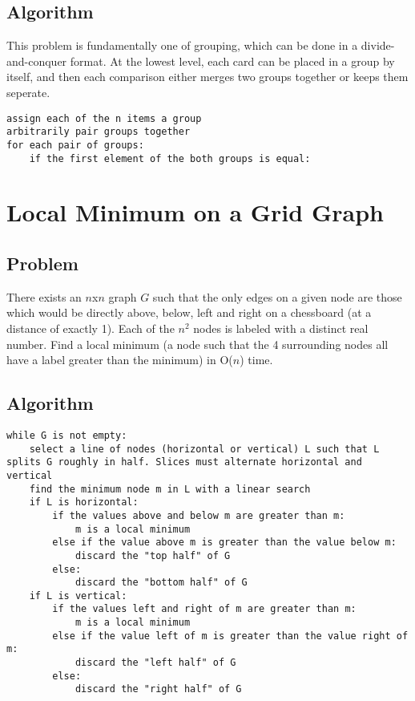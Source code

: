 \documentclass[titlepage]{article}
\numberwithin{equation}{subsection}
\begin{document}
\subsection{Algorithm}
This problem is fundamentally one of grouping, which can be done in a divide-and-conquer format.
At the lowest level, each card can be placed in a group by itself, and then each comparison either merges two
groups together or keeps them seperate.
\begin{lstlisting}
assign each of the n items a group
arbitrarily pair groups together
for each pair of groups:
    if the first element of the both groups is equal:
\end{lstlisting}
\section{Local Minimum on a Grid Graph}
\subsection{Problem}
There exists an $n$x$n$ graph $G$ such that the only edges on a given node are those
which would be directly above, below, left and right on a chessboard (at a distance of exactly 1).
Each of the $n^2$ nodes is labeled with a distinct real number. Find a local minimum (a node such that
the 4 surrounding nodes all have a label greater than the minimum) in O($n$) time.
\subsection{Algorithm}
\begin{minipage}{\linewidth}
\begin{lstlisting}
while G is not empty:
    select a line of nodes (horizontal or vertical) L such that L splits G roughly in half. Slices must alternate horizontal and vertical
    find the minimum node m in L with a linear search
    if L is horizontal:
        if the values above and below m are greater than m:
            m is a local minimum
        else if the value above m is greater than the value below m:
            discard the "top half" of G
        else:
            discard the "bottom half" of G
    if L is vertical:
        if the values left and right of m are greater than m:
            m is a local minimum
        else if the value left of m is greater than the value right of m:
            discard the "left half" of G
        else:
            discard the "right half" of G
\end{lstlisting}
\end{minipage}
\end{document}
